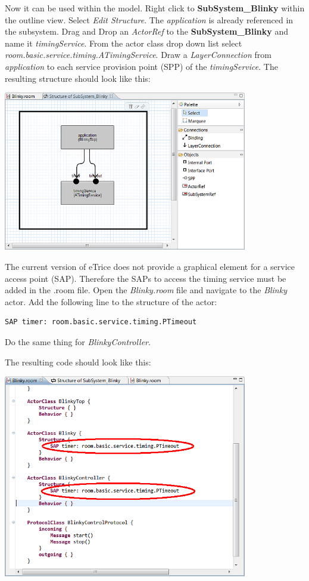 Now it can be used within the model. Right click to \textbf{SubSystem\_Blinky} within the outline view. Select \textit{Edit Structure}. The \textit{application} is already referenced in the subsystem. Drag and Drop an \textit{ActorRef} to the \textbf{SubSystem\_Blinky} and name it \textit{timingService}. From the actor class drop down list select \textit{room.basic.service.timing.ATimingService}. Draw a \textit{LayerConnection} from \textit{application} to each service provision point (SPP) of the \textit{timingService}. The resulting structure should look like this:

\includegraphics[width=0.8\textwidth]{images/020-Blinky06.png}

The current version of eTrice does not provide a graphical element for a service access point (SAP). Therefore the SAPs to access the timing service must be added in the .room file. Open the \textit{Blinky.room} file and navigate to the \textit{Blinky} actor. Add the following line to the structure of the actor:

\begin{verbatim}SAP timer: room.basic.service.timing.PTimeout \end{verbatim}

Do the same thing for \textit{BlinkyController}.

The resulting code should look like this:

\includegraphics[width=0.8\textwidth]{images/020-Blinky07.png}


